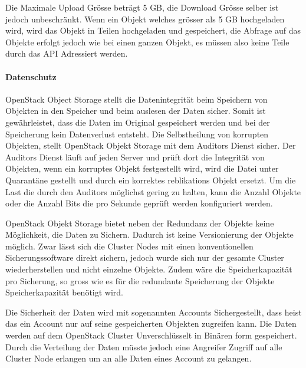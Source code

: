 Die Maximale Upload Grösse beträgt 5 GB, die Download Grösse selber ist jedoch unbeschränkt. Wenn ein Objekt welches grösser als 5 GB hochgeladen wird, wird das Objekt in Teilen hochgeladen und gespeichert, die Abfrage auf das Objekte erfolgt jedoch wie bei einen ganzen Objekt, es müssen also keine Teile durch das API Adressiert werden.\cite{OpenStack2012a}


\paragraph*{Datenschutz}
OpenStack Object Storage stellt die Datenintegrität beim Speichern von Objekten in den Speicher und beim auslesen der Daten sicher. Somit ist gewährleistet, dass die Daten im Original gespeichert werden und bei der Speicherung kein Datenverlust entsteht. Die Selbstheilung von korrupten Objekten, stellt OpenStack Objekt Storage mit dem Auditors Dienst sicher. Der Auditors Dienst läuft auf jeden Server und prüft dort die Integrität von Objekten, wenn ein korruptes Objekt festgestellt wird, wird die Datei unter Quarantäne gestellt und durch ein korrektes reblikations Objekt ersetzt.
Um die Last die durch den Auditors möglichst gering zu halten, kann die Anzahl Objekte oder die Anzahl Bits die pro Sekunde geprüft werden konfiguriert werden.\cite{OpenStack2012}

OpenStack Objekt Storage bietet neben der Redundanz der Objekte keine Möglichkeit, die Daten zu Sichern. Dadurch ist keine Versionierung der Objekte möglich. Zwar lässt sich die Cluster Nodes mit einen konventionellen Sicherungssoftware direkt sichern, jedoch wurde sich nur der gesamte Cluster wiederherstellen und nicht einzelne Objekte. Zudem wäre die Speicherkapazität pro Sicherung, so gross wie es für die redundante Speicherung der Objekte Speicherkapazität benötigt wird.
\cite{AndyBrezinsky2011}


Die Sicherheit der Daten wird mit sogenannten Accounts Sichergestellt, dass heist das ein Account nur auf seine gespeicherten Objekten zugreifen kann. Die Daten werden auf dem OpenStack Cluster Unverschlüsselt in Binären form gespeichert. Durch die Verteilung der Daten müsste jedoch eine Angreifer Zugriff auf alle Cluster Node erlangen um an alle Daten eines Account zu gelangen.

